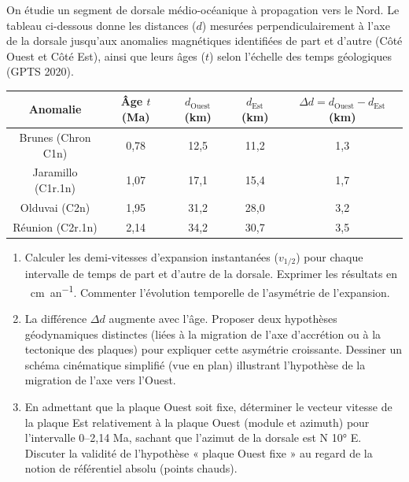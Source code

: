 \documentclass[11pt]{article}
\begin{document}
\begin{exercice}
On étudie un segment de dorsale médio-océanique à propagation vers le Nord. Le tableau ci-dessous donne les distances ($d$) mesurées perpendiculairement à l'axe de la dorsale jusqu'aux anomalies magnétiques identifiées de part et d'autre (Côté Ouest et Côté Est), ainsi que leurs âges ($t$) selon l'échelle des temps géologiques (GPTS 2020).

\begin{center}
\begin{tabular}{|c|c|c|c|c|}
\hline
Anomalie & Âge $t$ (Ma) & $d_{\text{Ouest}}$ (km) & $d_{\text{Est}}$ (km) & $\Delta d = d_{\text{Ouest}} - d_{\text{Est}}$ (km) \\
\hline
Brunes (Chron C1n) & 0,78 & 12,5 & 11,2 & 1,3 \\
Jaramillo (C1r.1n) & 1,07 & 17,1 & 15,4 & 1,7 \\
Olduvai (C2n) & 1,95 & 31,2 & 28,0 & 3,2 \\
Réunion (C2r.1n) & 2,14 & 34,2 & 30,7 & 3,5 \\
\hline
\end{tabular}
\end{center}

\begin{enumerate}
    \item Calculer les demi-vitesses d'expansion instantanées ($v_{1/2}$) pour chaque intervalle de temps de part et d'autre de la dorsale. Exprimer les résultats en \SI{}{cm.an^{-1}}. Commenter l'évolution temporelle de l'asymétrie de l'expansion.
    \item La différence $\Delta d$ augmente avec l'âge. Proposer deux hypothèses géodynamiques distinctes (liées à la migration de l'axe d'accrétion ou à la tectonique des plaques) pour expliquer cette asymétrie croissante. Dessiner un schéma cinématique simplifié (vue en plan) illustrant l'hypothèse de la migration de l'axe vers l'Ouest.
    \item En admettant que la plaque Ouest soit fixe, déterminer le vecteur vitesse de la plaque Est relativement à la plaque Ouest (module et azimuth) pour l'intervalle 0--2,14 Ma, sachant que l'azimut de la dorsale est N 10° E. Discuter la validité de l'hypothèse « plaque Ouest fixe » au regard de la notion de référentiel absolu (points chauds).
\end{enumerate}
\end{exercice}
\end{document}
